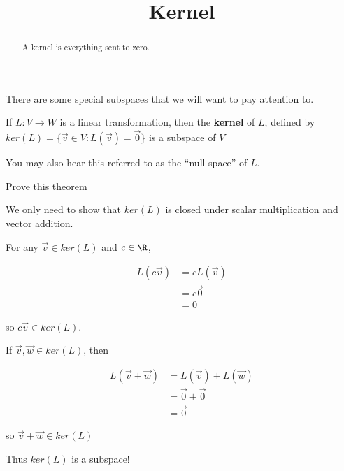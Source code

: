 \documentclass{ximera}
\title{Kernel}
\begin{document}
\begin{abstract}
	A kernel is everything sent to zero.
\end{abstract}

There are some special subspaces that we will want to pay attention to.

\begin{theorem}
	If $L:V \to W$ is a linear transformation, then the \textbf{kernel} of $L$, defined by $ker(L) = \{\vec{v} \in V:L(\vec{v}) = \vec{0}\}$ is a subspace of $V$
\end{theorem}

You may also hear this referred to as the ``null space'' of $L$.

Prove this theorem

\begin{free-response}
We only need to show that $ker(L)$ is closed under scalar multiplication and vector addition.

For any $\vec{v} \in ker(L)$ and $c \in \R$,

\begin{align*}
	L(c\vec{v}) &=cL(\vec{v})\\
		&=c\vec{0}\\
		&=0
\end{align*}

so $c\vec{v} \in ker(L)$.

If $\vec{v},\vec{w} \in ker(L)$, then

\begin{align*}
	L(\vec{v}+\vec{w}) &= L(\vec{v})+L(\vec{w})\\
	&= \vec{0}+\vec{0}\\
	&=\vec{0}
\end{align*}

so $\vec{v}+\vec{w} \in ker(L)$

Thus $ker(L)$ is a subspace!

\end{free-response}
\end{document}
